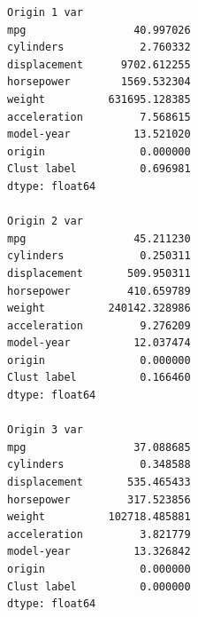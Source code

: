\documentclass[11pt]{article}
\begin{document}
    \begin{Verbatim}[commandchars=\\\{\}]
Origin 1 var
mpg                 40.997026
cylinders            2.760332
displacement      9702.612255
horsepower        1569.532304
weight          631695.128385
acceleration         7.568615
model-year          13.521020
origin               0.000000
Clust label          0.696981
dtype: float64

Origin 2 var
mpg                 45.211230
cylinders            0.250311
displacement       509.950311
horsepower         410.659789
weight          240142.328986
acceleration         9.276209
model-year          12.037474
origin               0.000000
Clust label          0.166460
dtype: float64

Origin 3 var
mpg                 37.088685
cylinders            0.348588
displacement       535.465433
horsepower         317.523856
weight          102718.485881
acceleration         3.821779
model-year          13.326842
origin               0.000000
Clust label          0.000000
dtype: float64

    \end{Verbatim}
\end{document}
